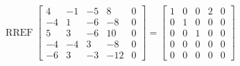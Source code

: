 \begin{exerciseAnswer} 


\[\operatorname{RREF} \left[\begin{array}{cccc|c}
4 & -1 & -5 & 8 & 0 \\
-4 & 1 & -6 & -8 & 0 \\
5 & 3 & -6 & 10 & 0 \\
-4 & -4 & 3 & -8 & 0 \\
-6 & 3 & -3 & -12 & 0
\end{array}\right] = \left[\begin{array}{cccc|c}
1 & 0 & 0 & 2 & 0 \\
0 & 1 & 0 & 0 & 0 \\
0 & 0 & 1 & 0 & 0 \\
0 & 0 & 0 & 0 & 0 \\
0 & 0 & 0 & 0 & 0
\end{array}\right] \]



\end{exerciseAnswer}

